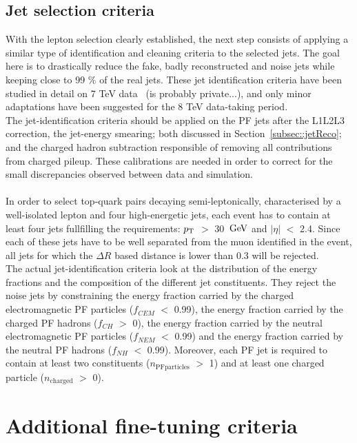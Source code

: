 \subsection{Jet selection criteria}   %
With the lepton selection clearly established, the next step consists of applying a similar type of identification and cleaning criteria to the selected jets.
The goal here is to drastically reduce the fake, badly reconstructed and noise jets while keeping close to 99 $\%$ of the real jets. These jet identification criteria have been studied in detail on 7 TeV data~\cite{JetId7TeV} (is probably private...), and only minor adaptations have been suggested for the 8 TeV data-taking period.
\\
The jet-identification criteria should be applied on the PF jets after the L1L2L3 correction, the jet-energy smearing; both discussed in Section~\ref{subsec::jetReco}; and the charged hadron subtraction responsible of removing all contributions from charged pileup. These calibrations are needed in order to correct for the small discrepancies observed between data and simulation.
\\
\\
In order to select top-quark pairs decaying semi-leptonically, characterised by a well-isolated lepton and four high-energetic jets, each event has to contain at least four jets fullfilling the requirements: $p_{\rm T}$ $>$ 30 $\, \mathrm{GeV}$ and $\vert \eta \vert$ $<$ 2.4.
Since each of these jets have to be well separated from the muon identified in the event, all jets for which the $\Delta R$ based distance is lower than 0.3 will be rejected.
\\
The actual jet-identification criteria look at the distribution of the energy fractions and the composition of the different jet constituents.
They reject the noise jets by constraining the energy fraction carried by the charged electromagnetic PF particles ($f_{CEM}$ $<$ 0.99), the energy fraction carried by the charged PF hadrons ($f_{CH}$ $>$ 0), the energy fraction carried by the neutral electromagnetic PF particles ($f_{NEM}$ $<$ 0.99) and the energy fraction carried by the neutral PF hadrons ($f_{NH}$ $<$ 0.99).
Moreover, each PF jet is required to contain at least two constituents ($n_{\textrm{PFparticles}}$ $>$ 1) and at least one charged particle ($n_{\textrm{charged}}$ $>$ 0).

\section{Additional fine-tuning criteria}\label{sec::SpecificSelec}

